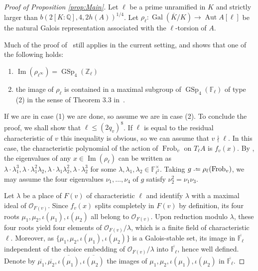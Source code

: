 \begin{proof}[Proof of Proposition \ref{prop:Main}]
Let $\ell$ be a prime unramified in $K$ and strictly larger than $b(2[K:\mathbb{Q}],4,2h(A))^{1/4}$.
Let $\rho_\ell : \operatorname{Gal}\left(\overline{K}/K \right) \to \operatorname{Aut} A[\ell]$ be the natural Galois representation associated with the $\ell$-torsion of $A$. 

Much of the proof of~\cite[Theorem 3.19]{lombardoGL2type} still applies in the current setting, and shows that one of the following holds:
\begin{enumerate}
\item $\operatorname{Im}(\rho_{\ell^\infty}) = \operatorname{GSp}_{4}(\mathbb{Z}_\ell)$
\item the image of $\rho_\ell$ is contained in a maximal subgroup of $\operatorname{GSp}_4(\mathbb{F}_\ell)$ of type (2) in the sense of Theorem 3.3 in~\cite{lombardoGL2type}.
\end{enumerate}
If we are in case (1) we are done, so assume we are in case (2). To conclude the proof, we shall show that $\ell \leq (2q_v)^8$. If $\ell$ is equal to the residual characteristic of $v$ this inequality is obvious, so we can assume that $v \nmid \ell$. In this case, the characteristic polynomial of the action of $\operatorname{Frob}_v$ on $T_\ell A$ is $f_v(x)$.
 By \cite[Lemma 3.4]{lombardoGL2type}, the eigenvalues of any $x \in \operatorname{Im}(\rho_\ell)$ can be written as $\lambda \cdot \lambda_1^3, \lambda \cdot  \lambda_1^2\lambda_2, \lambda \cdot \lambda_1\lambda_2^2,\lambda \cdot \lambda_2^3$ for some $\lambda, \lambda_1, \lambda_2 \in \mathbb{F}_{\ell^2}^\times$. Taking $g\defeq\rho_\ell(\operatorname{Frob}_v)$, we may assume the four eigenvalues $\nu_1, \ldots, \nu_4$ of $g$ satisfy $\nu_2^2=\nu_1\nu_3$. 

Let $\lambda$ be a place of $F(v)$ of characteristic $\ell$ and identify $\lambda$ with a maximal ideal of $\mathcal{O}_{F(v)}$. Since $f_v(x)$ splits completely in $F(v)$ by definition, its four roots $\mu_1, \mu_2, \iota(\mu_1), \iota(\mu_2)$ all belong to $\mathcal{O}_{F(v)}$. Upon reduction modulo $\lambda$, these four roots yield four elements of $\mathcal{O}_{F(v)}/\lambda$, which is a finite field of characteristic $\ell$. Moreover, as $\{\mu_1, \mu_2, \iota(\mu_1), \iota(\mu_2)\}$ is a Galois-stable set, its image in $\overline{\mathbb{F}_\ell}$ independent of the choice embedding of $\mathcal{O}_{F(v)}/\lambda$ into $\overline{\mathbb{F}_\ell}$, hence well defined. Denote by $\overline{\mu_1}, \overline{\mu_2}, \overline{\iota(\mu_1)}, \overline{\iota(\mu_2)}$ the images of $\mu_1, \mu_2, \iota(\mu_1), \iota(\mu_2)$ in $\overline{\mathbb{F}_\ell}$.


\end{proof}
